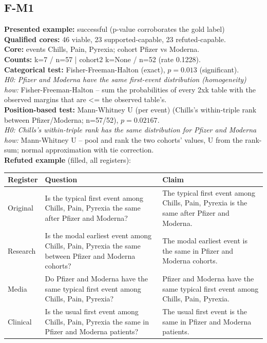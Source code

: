 \documentclass[11pt]{article}
\begin{document}
\subsection*{F-M1}
\textbf{Presented example:} successful (p-value corroborates the gold label) \\
\textbf{Qualified cores:} 46 viable, 23 supported-capable, 23 refuted-capable. \\
\textbf{Core:} events Chills, Pain, Pyrexia; cohort Pfizer vs Moderna. \\
\textbf{Counts:} k=7 / n=57  |  cohort2 k=None / n=52  (rate 0.1228). \\
\textbf{Categorical test:} Fisher-Freeman-Halton (exact), $p = 0.013$ (significant). \\
\emph{H0: Pfizer and Moderna have the same first-event distribution (homogeneity)} \\
\emph{how:} Fisher-Freeman-Halton -- sum the probabilities of every 2xk table with the observed margins that are <= the observed table's. \\
\textbf{Position-based test:} Mann-Whitney U (per event) (Chills's within-triple rank between Pfizer/Moderna; n=57/52), $p = 0.02167$. \\
\emph{H0: Chills's within-triple rank has the same distribution for Pfizer and Moderna} \\
\emph{how:} Mann-Whitney U -- pool and rank the two cohorts' values, U from the rank-sum; normal approximation with tie correction. \\
\textbf{Refuted example} (filled, all registers): \\
\begin{tabularx}{\linewidth}{@{}l L L@{}}
\toprule
\textbf{Register} & \textbf{Question} & \textbf{Claim} \\
\midrule
Original & Is the typical first event among Chills, Pain, Pyrexia the same after Pfizer and Moderna? & The typical first event among Chills, Pain, Pyrexia is the same after Pfizer and Moderna. \\
Research & Is the modal earliest event among Chills, Pain, Pyrexia the same between Pfizer and Moderna cohorts? & The modal earliest event is the same in Pfizer and Moderna cohorts. \\
Media & Do Pfizer and Moderna have the same typical first event among Chills, Pain, Pyrexia? & Pfizer and Moderna have the same typical first event among Chills, Pain, Pyrexia. \\
Clinical & Is the usual first event among Chills, Pain, Pyrexia the same in Pfizer and Moderna patients? & The usual first event is the same in Pfizer and Moderna patients. \\
\bottomrule
\end{tabularx}
\vspace{3pt}
\end{document}
